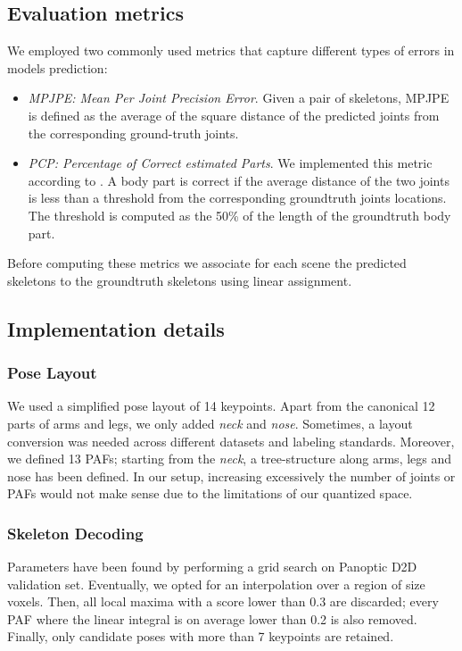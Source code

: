 \documentclass[a4paper,conference]{IEEEtran}
\begin{document}
\subsection{Evaluation metrics}
We employed two commonly used metrics that capture different types of errors in models prediction:
\begin{itemize}
    \item \emph{MPJPE: Mean Per Joint Precision Error}. Given a pair of skeletons, MPJPE is defined as the average of the square distance of the predicted joints from the corresponding ground-truth joints.
    \item \emph{PCP: Percentage of Correct estimated Parts}. We implemented this metric according to \cite{dong2019fast}. A body part is correct if the average distance of the two joints is less than a threshold from the corresponding groundtruth joints locations. The threshold is computed as the 50\% of the length of the groundtruth body part.
\end{itemize}
Before computing these metrics we associate for each scene the predicted skeletons to the groundtruth skeletons using linear assignment.

\subsection{Implementation details}\label{sec:implementation}
\subsubsection{Pose Layout}
We used a simplified pose layout of 14 keypoints. Apart from the canonical 12 parts of arms and legs, we only added \textit{neck} and \textit{nose}. Sometimes, a layout conversion was needed across different datasets and labeling standards. Moreover, we defined 13 PAFs; starting from the \textit{neck}, a tree-structure along arms, legs and nose has been defined. In our setup, increasing excessively the number of joints or PAFs would not make sense due to the limitations of our quantized space.
\subsubsection{Skeleton Decoding}
Parameters have been found by performing a grid search on Panoptic D2D validation set. Eventually, we opted for an interpolation over a region of size  voxels. Then, all local maxima with a score lower than 0.3 are discarded; every PAF where the linear integral is on average lower than 0.2 is also removed. Finally, only candidate poses with more than 7 keypoints are retained.
\end{document}
